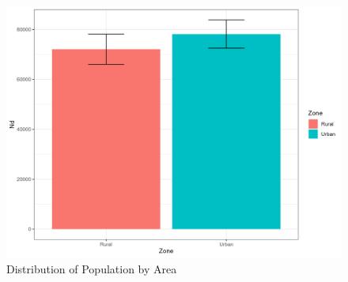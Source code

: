 \documentclass[
  12pt,
]{book}
\begin{document}
\begin{figure}
\includegraphics[width=33.33in]{www/05_graficas/03_bar_pers} \caption{Distribution of Population by Area}\label{fig:barIncome}
\end{figure}
\end{document}
